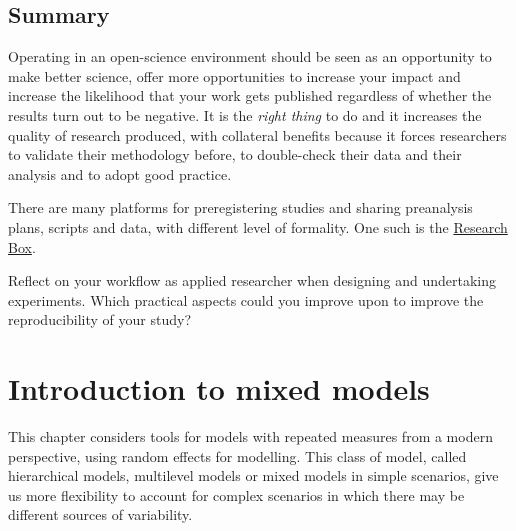 \documentclass[
  11pt,
  letterpaper,
]{scrbook}
\theoremstyle{definition}
\theoremstyle{definition}
\theoremstyle{remark}
\begin{document}
\section{Summary}\label{summary-4}

Operating in an open-science environment should be seen as an
opportunity to make better science, offer more opportunities to increase
your impact and increase the likelihood that your work gets published
regardless of whether the results turn out to be negative. It is the
\emph{right thing} to do and it increases the quality of research
produced, with collateral benefits because it forces researchers to
validate their methodology before, to double-check their data and their
analysis and to adopt good practice.

There are many platforms for preregistering studies and sharing
preanalysis plans, scripts and data, with different level of formality.
One such is the \href{https://researchbox.org/}{Research Box}.

\begin{tcolorbox}[enhanced jigsaw, opacityback=0, opacitybacktitle=0.6, leftrule=.75mm, colbacktitle=quarto-callout-tip-color!10!white, breakable, toptitle=1mm, bottomrule=.15mm, title=\textcolor{quarto-callout-tip-color}{\faLightbulb}\hspace{0.5em}{Your turn}, coltitle=black, colframe=quarto-callout-tip-color-frame, colback=white, left=2mm, toprule=.15mm, arc=.35mm, bottomtitle=1mm, titlerule=0mm, rightrule=.15mm]

Reflect on your workflow as applied researcher when designing and
undertaking experiments. Which practical aspects could you improve upon
to improve the reproducibility of your study?

\end{tcolorbox}


\chapter{Introduction to mixed
models}\label{introduction-to-mixed-models}

This chapter considers tools for models with repeated measures from a
modern perspective, using random effects for modelling. This class of
model, called hierarchical models, multilevel models or mixed models in
simple scenarios, give us more flexibility to account for complex
scenarios in which there may be different sources of variability.
\end{document}
